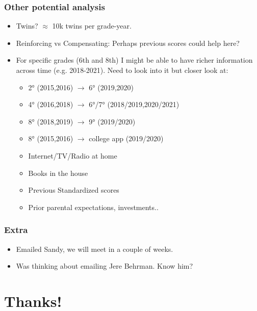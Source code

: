 \documentclass{beamer}
\begin{document}
\begin{frame}
    \label{update_scott}
    \frametitle{Other potential analysis}
        \begin{itemize}
        \item Twins? $\approx$ 10k twins per grade-year.
        \item Reinforcing vs Compensating: Perhaps previous scores could help here?
        \item For specific grades (6th and 8th) I might be able to have richer information across time (e.g. 2018-2021). Need to look into it but closer look at:
        \begin{itemize}
            \item 2° (2015,2016) $\rightarrow$ 6° (2019,2020)
            \item 4° (2016,2018) $\rightarrow$ 6°/7° (2018/2019,2020/2021)
            \item 8° (2018,2019) $\rightarrow$ 9° (2019/2020)
            \item 8° (2015,2016) $\rightarrow$ college app (2019/2020)
        \end{itemize}
        
        \begin{itemize}
        \item Internet/TV/Radio at home
        \item Books in the house
        \item Previous Standardized scores
        \item Prior parental expectations, investments..
        \end{itemize}
        \end{itemize}
\end{frame}

\begin{frame}
    \label{update_scott}
    \frametitle{Extra}
        \begin{itemize}
        \item Emailed Sandy, we will meet in a couple of weeks.
        \item Was thinking about emailing Jere Behrman. Know him?
        \end{itemize}
\end{frame}


\section{Thanks!}
\end{document}
